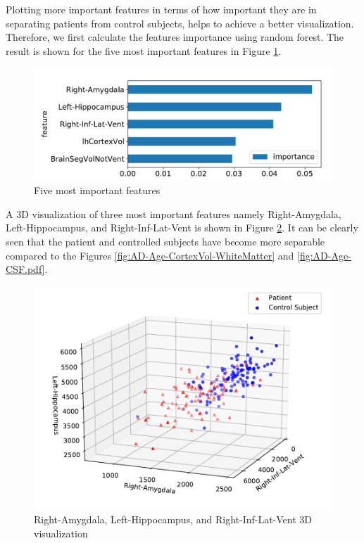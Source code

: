 Plotting more important features in terms of how important they are in separating patients from control subjects, helps to achieve a better visualization. Therefore, we first calculate the features importance using random forest. The result is shown for the five most important features in Figure \ref{fig:feature-imp}.

 \begin{figure}
 	\centering
 	\includegraphics[width=\columnwidth]{images/feature-importance-resize.pdf}
 	\caption{Five most important features}
 	\label{fig:feature-imp}
 \end{figure}

A 3D visualization of three most important features namely Right-Amygdala, Left-Hippocampus, and Right-Inf-Lat-Vent is shown in Figure \ref{fig:3d}. It can be clearly seen that the patient and controlled subjects have become more separable compared to the Figures \ref{fig:AD-Age-CortexVol-WhiteMatter} and \ref{fig:AD-Age-CSF.pdf}.

 \begin{figure}
	\centering
	\includegraphics[width=\columnwidth]{images/3d.pdf}
	\caption{Right-Amygdala, Left-Hippocampus, and Right-Inf-Lat-Vent 3D visualization}
	\label{fig:3d}
\end{figure}

